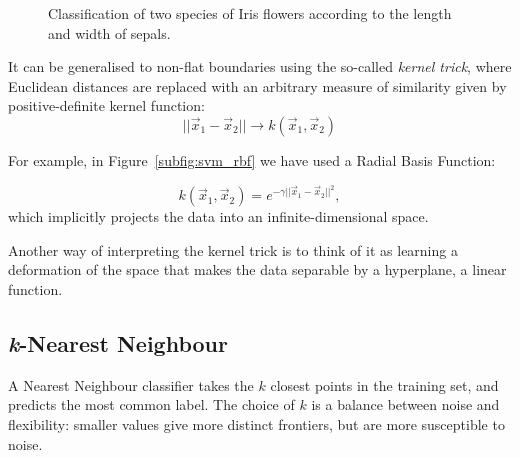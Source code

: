 \begin{figure}
\centering
{}%
\hfill
{}%
\caption{Classification of two species of Iris flowers according to the length and width of sepals.}\label{fig:svm}
\end{figure}

It can be generalised  to non-flat boundaries using the so-called \emph{kernel trick}, where Euclidean distances are replaced with an arbitrary measure of similarity given by positive-definite kernel function:
\[||\vec{x}_1 - \vec{x}_2|| \rightarrow k(\vec{x}_1, \vec{x}_2)\]

For example, in Figure~\ref{subfig:svm_rbf} we have used a Radial Basis Function:

\[k(\vec{x}_1, \vec{x}_2) = e^{-\gamma ||\vec{x}_1 - \vec{x}_2||^2 },\]
which implicitly projects the data into an infinite-dimensional space.

Another way of interpreting the kernel trick is to think of it as learning a deformation of the space that makes the data separable by a hyperplane, a linear function.

\subsection{\emph{k}-Nearest Neighbour}
A Nearest Neighbour classifier takes the $k$ closest points in the training set, and predicts the most common label.
The choice of $k$ is a balance between noise and flexibility: smaller values give more distinct frontiers, but are more susceptible to noise.

